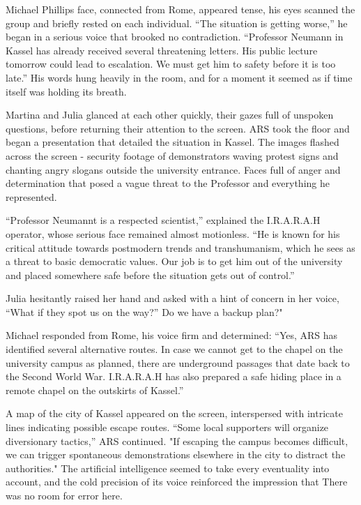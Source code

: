 \documentclass[
]{article}
\begin{document}
Michael Phillips\textquotesingle{} face, connected from Rome, appeared
tense, his eyes scanned the group and briefly rested on each individual.
``The situation is getting worse,'' he began in a serious voice that
brooked no contradiction. ``Professor Neumann in Kassel has already
received several threatening letters. His public lecture tomorrow could
lead to escalation. We must get him to safety before it is too late.''
His words hung heavily in the room, and for a moment it seemed as if
time itself was holding its breath.

Martina and Julia glanced at each other quickly, their gazes full of
unspoken questions, before returning their attention to the screen. ARS
took the floor and began a presentation that detailed the situation in
Kassel. The images flashed across the screen - security footage of
demonstrators waving protest signs and chanting angry slogans outside
the university entrance. Faces full of anger and determination that
posed a vague threat to the Professor and everything he represented.

``Professor Neumannt is a respected scientist,'' explained the
I.R.A.R.A.H operator, whose serious face remained almost motionless.
``He is known for his critical attitude towards postmodern trends and
transhumanism, which he sees as a threat to basic democratic values. Our
job is to get him out of the university and placed somewhere safe before
the situation gets out of control.''

Julia hesitantly raised her hand and asked with a hint of concern in her
voice, ``What if they spot us on the way?'' Do we have a backup plan?"

Michael responded from Rome, his voice firm and determined: ``Yes, ARS
has identified several alternative routes. In case we cannot get to the
chapel on the university campus as planned, there are underground
passages that date back to the Second World War. I.R.A.R.A.H has also
prepared a safe hiding place in a remote chapel on the outskirts of
Kassel.''

A map of the city of Kassel appeared on the screen, interspersed with
intricate lines indicating possible escape routes. ``Some local
supporters will organize diversionary tactics,'' ARS continued. "If
escaping the campus becomes difficult, we can trigger spontaneous
demonstrations elsewhere in the city to distract the authorities." The
artificial intelligence seemed to take every eventuality into account,
and the cold precision of its voice reinforced the impression that There
was no room for error here.
\end{document}
